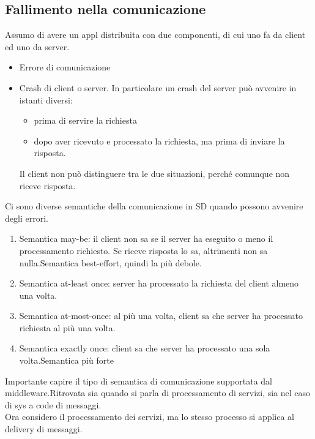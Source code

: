 \documentclass{article}
\begin{document}
\subsection{Fallimento nella comunicazione}
Assumo di avere un appl distribuita con due componenti, di cui uno fa da client ed uno da server.\\
\begin{itemize}
\item Errore di comunicazione
\item Crash di client o server. In particolare un crash del server può avvenire in istanti diversi:
\begin{itemize}
\item prima di servire la richiesta
\item dopo aver ricevuto e processato la richiesta, ma prima di inviare la risposta.
\end{itemize}
Il client non può distinguere tra le due situazioni, perché comunque non riceve risposta.
\end{itemize}
Ci sono diverse semantiche della comunicazione in SD quando possono avvenire degli errori.
\begin{enumerate}
\item Semantica may-be: il client non sa se il server ha eseguito o meno il processamento richiesto. Se riceve risposta lo sa, altrimenti non sa nulla.Semantica best-effort, quindi la più debole.
\item Semantica at-least once: server ha processato la richiesta del client almeno una volta.
\item Semantica at-most-once: al più una volta, client sa che server ha processato richiesta al più una volta.
\item Semantica exactly once: client sa che server ha processato una sola volta.Semantica più forte
\end{enumerate}
Importante capire il tipo di semantica di comunicazione supportata dal middleware.Ritrovata sia quando si parla di processamento di servizi, sia nel caso di sys a code di messaggi.\\
Ora considero il processamento dei servizi, ma lo stesso processo si applica al delivery di messaggi.
\end{document}

